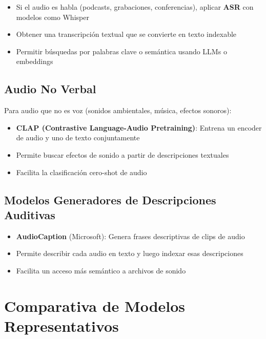 \begin{itemize}
  \item Si el audio es habla (podcasts, grabaciones, conferencias), aplicar \textbf{ASR} con modelos como Whisper
  \item Obtener una transcripción textual que se convierte en texto indexable
  \item Permitir búsquedas por palabras clave o semántica usando LLMs o embeddings
\end{itemize}

\subsection{Audio No Verbal}

Para audio que no es voz (sonidos ambientales, música, efectos sonoros):
\begin{itemize}
  \item \textbf{CLAP (Contrastive Language-Audio Pretraining)}: Entrena un encoder de audio y uno de texto conjuntamente
  \item Permite buscar efectos de sonido a partir de descripciones textuales
  \item Facilita la clasificación cero-shot de audio
\end{itemize}

\subsection{Modelos Generadores de Descripciones Auditivas}

\begin{itemize}
  \item \textbf{AudioCaption} (Microsoft): Genera frases descriptivas de clips de audio
  \item Permite describir cada audio en texto y luego indexar esas descripciones
  \item Facilita un acceso más semántico a archivos de sonido
\end{itemize}

\section{Comparativa de Modelos Representativos}

